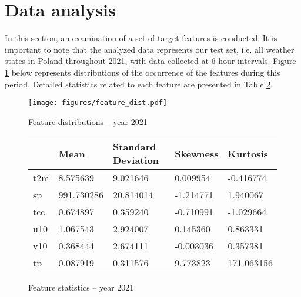\section{Data analysis}
In this section, an examination of a set of target features is conducted. It is important to note that the analyzed data represents our test set, i.e. all weather states in Poland throughout 2021, with data collected at 6-hour intervals. Figure \ref{fig:dist} below represents distributions of the occurrence of the features during this period. Detailed statistics related to each feature are presented in Table \ref{tab:stats}.
\begin{figure}[!ht]
    \centering
    \texttt{[image: figures/feature\_dist.pdf]}
    \caption{Feature distributions -- year 2021}
    \label{fig:dist}
\end{figure} 


\begin{figure}[!ht]
    \centering
    \begin{tabular}{C{2.5cm}C{2.5cm}C{2.5cm}C{2.5cm}C{2.5cm}}
        \toprule
        & Mean & Standard Deviation & Skewness & Kurtosis \\
        \midrule
        t2m & 8.575639 & 9.021646 & 0.009954 & -0.416774 \\
        sp & 991.730286 & 20.814014 & -1.214771 & 1.940067 \\
        tcc & 0.674897 & 0.359240 & -0.710991 & -1.029664 \\
        u10 & 1.067543 & 2.924007 & 0.145360 & 0.863331 \\
        v10 & 0.368444 & 2.674111 & -0.003036 & 0.357381 \\
        tp & 0.087919 & 0.311576 & 9.773823 & 171.063156 \\
        \bottomrule
    \end{tabular}
    \caption{Feature statistics -- year 2021}
    \label{tab:stats}
\end{figure}

